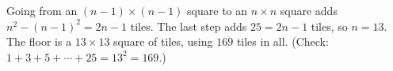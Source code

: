 Going from an $(n-1)\times(n-1)$ square to an $n\times n$ square adds $n^2-(n-1)^2=2n-1$ tiles. The last step adds $25=2n-1$ tiles, so $n=13$. The floor is a $\boxed{13\times13}$ square of tiles, using $169$ tiles in all. (Check: $1+3+5+\cdots+25=13^2=169$.)
